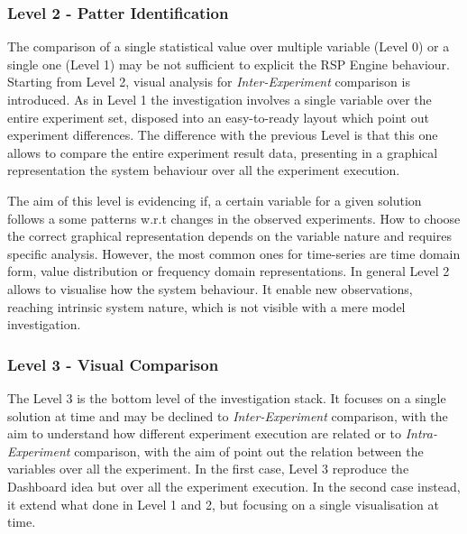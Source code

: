 \subsubsection{Level 2 - Patter Identification}\label{sec:heaven-level2}


The comparison of a single statistical value over multiple variable (Level 0) or a single one (Level 1) may be not sufficient to explicit the RSP Engine behaviour. Starting from Level 2, visual analysis for \textit{Inter-Experiment} comparison is introduced. As in Level 1 the investigation involves a single variable over the entire experiment set, disposed into an easy-to-ready layout which point out experiment differences. The difference with the previous Level is that this one allows to compare the entire experiment result data, presenting in a graphical representation the system behaviour over all the experiment execution.

The aim of this level is evidencing if, a certain variable for a given solution follows a some patterns w.r.t changes in the observed experiments. How to choose the correct graphical representation depends on the variable nature and requires specific analysis. However, the most common ones for time-series are  time domain form, value distribution or frequency domain representations. In general Level 2 allows to visualise how the system behaviour. It enable new observations, reaching intrinsic system nature, which is not visible with a mere model investigation.

\subsubsection{Level 3 - Visual Comparison}\label{sec:heaven-level3}

The Level 3 is the bottom level of the investigation stack. It focuses on a single solution at time and may be declined to \textit{Inter-Experiment} comparison, with the aim to understand how different experiment execution are related or to  \textit{Intra-Experiment} comparison, with the aim of point out the relation between the variables over all the experiment. In the first case, Level 3 reproduce the Dashboard idea but over all the experiment execution. In the second case instead, it extend what done in Level 1 and 2, but focusing on a single visualisation at time.






